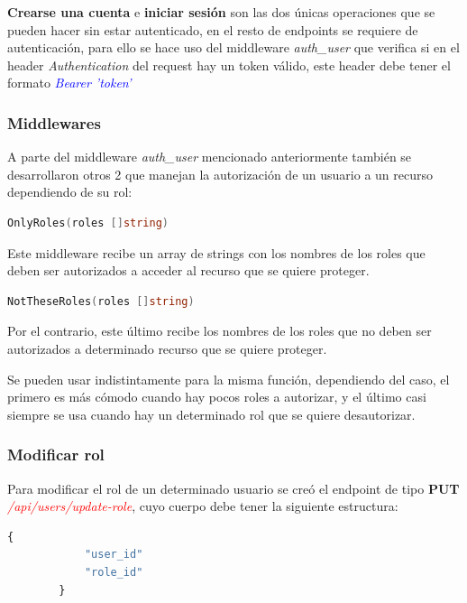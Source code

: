 \textbf{Crearse una cuenta} e \textbf{iniciar sesión} son las dos únicas operaciones que se pueden hacer sin estar autenticado, en el resto de endpoints se requiere de autenticación, para ello se hace uso del middleware \textit{auth\_user} que verifica si en el header \textit{Authentication} del request hay un token válido, este header debe tener el formato \textit{\textcolor{blue}{Bearer 'token'}}
\newline

\subsubsection{Middlewares}

A parte del middleware \textit{auth\_user} mencionado anteriormente también se desarrollaron otros 2 que manejan la autorización de un usuario a un recurso dependiendo de su rol:

\begin{lstlisting}[language=go]
	OnlyRoles(roles []string)
\end{lstlisting}

Este middleware recibe un array de strings con los nombres de los roles que deben ser autorizados a acceder al recurso que se quiere proteger.

\begin{lstlisting}[language=go]
	NotTheseRoles(roles []string)
\end{lstlisting}

Por el contrario, este último recibe los nombres de los roles que no deben ser autorizados a determinado recurso que se quiere proteger.
\newline

Se pueden usar indistintamente para la misma función, dependiendo del caso, el primero es más cómodo cuando hay pocos roles a autorizar, y el último casi siempre se usa cuando hay un determinado rol que se quiere desautorizar. 
\newline

\subsubsection{Modificar rol}

Para modificar el rol de un determinado usuario se creó el endpoint de tipo \textbf{PUT} \textit{\textcolor{red}{/api/users/update-role}}, cuyo cuerpo debe tener la siguiente estructura:

\begin{lstlisting}[language=javascript]
		{
			"user_id"
			"role_id"
		}
\end{lstlisting}

